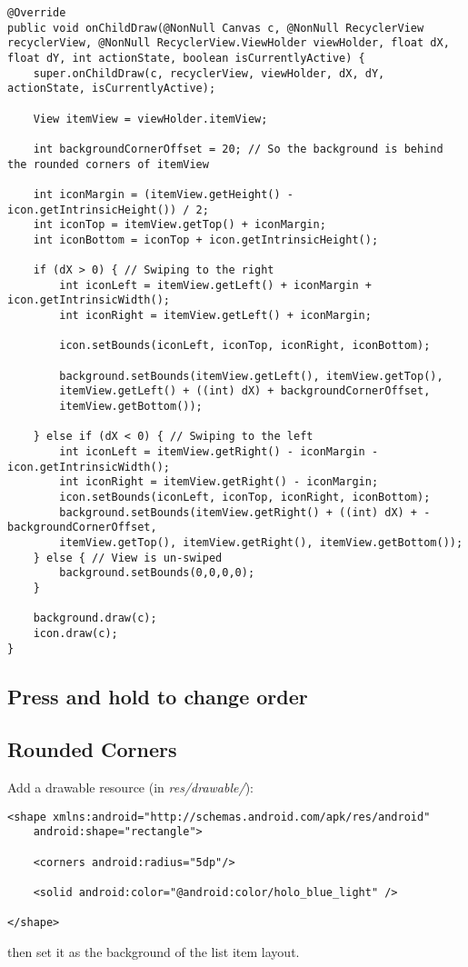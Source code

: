 \documentclass[]{article}
\renewcommand{\it}[1]{\textit{#1}}
\begin{document}
\begin{lstlisting}
@Override
public void onChildDraw(@NonNull Canvas c, @NonNull RecyclerView recyclerView, @NonNull RecyclerView.ViewHolder viewHolder, float dX, float dY, int actionState, boolean isCurrentlyActive) {
	super.onChildDraw(c, recyclerView, viewHolder, dX, dY, actionState, isCurrentlyActive);
	
	View itemView = viewHolder.itemView;
	
	int backgroundCornerOffset = 20; // So the background is behind the rounded corners of itemView
	
	int iconMargin = (itemView.getHeight() - icon.getIntrinsicHeight()) / 2;
	int iconTop = itemView.getTop() + iconMargin;
	int iconBottom = iconTop + icon.getIntrinsicHeight();
	
	if (dX > 0) { // Swiping to the right
		int iconLeft = itemView.getLeft() + iconMargin + icon.getIntrinsicWidth();
		int iconRight = itemView.getLeft() + iconMargin;
		
		icon.setBounds(iconLeft, iconTop, iconRight, iconBottom);
		
		background.setBounds(itemView.getLeft(), itemView.getTop(),
		itemView.getLeft() + ((int) dX) + backgroundCornerOffset,
		itemView.getBottom());
		
	} else if (dX < 0) { // Swiping to the left
		int iconLeft = itemView.getRight() - iconMargin - icon.getIntrinsicWidth();
		int iconRight = itemView.getRight() - iconMargin;
		icon.setBounds(iconLeft, iconTop, iconRight, iconBottom);
		background.setBounds(itemView.getRight() + ((int) dX) + - backgroundCornerOffset,
		itemView.getTop(), itemView.getRight(), itemView.getBottom());
	} else { // View is un-swiped
		background.setBounds(0,0,0,0);
	}
	
	background.draw(c);
	icon.draw(c);
}
\end{lstlisting}

\subsection{Press and hold to change order}

\subsection{Rounded Corners}
Add a drawable resource (in \it{res/drawable/}):
\begin{lstlisting}
<shape xmlns:android="http://schemas.android.com/apk/res/android"
	android:shape="rectangle">
	
	<corners android:radius="5dp"/>
	
	<solid android:color="@android:color/holo_blue_light" />

</shape>
\end{lstlisting}
then set it as the background of the list item layout.
\end{document}
